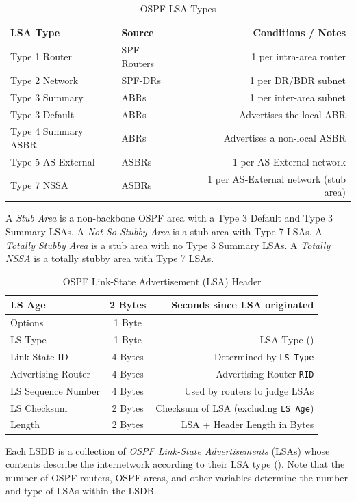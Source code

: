 \documentclass[12pt]{article}
\begin{document}
	\begin{table}[H]
	\centering
	\caption{OSPF LSA Types \label{tab:OSPF LSA TYPES}}
	\begin{tabular}{llr}\hline
	\textbf{LSA Type}		& \textbf{Source}		& \textbf{Conditions / Notes}\\\hline
	Type 1 Router		& SPF-Routers		& 1 per intra-area router\\\hline
	Type 2 Network		& SPF-DRs			& 1 per DR/BDR subnet\\\hline
	Type 3 Summary		& ABRs			& 1 per inter-area subnet\\\hline
	Type 3 Default		& ABRs			& Advertises the local ABR\\\hline
	Type 4 Summary ASBR	& ABRs			& Advertises a non-local ASBR\\\hline
	Type 5 AS-External	& ASBRs			& 1 per AS-External network\\\hline
	Type 7 NSSA		& ASBRs			& 1 per AS-External network (stub area)\\\hline
	\end{tabular}\end{table}
	
	A \textit{Stub Area} is a non-backbone OSPF area with a Type 3 Default and Type 3 Summary LSAs. A \textit{Not-So-Stubby Area} is a stub area with Type 7 LSAs. A \textit{Totally Stubby Area} is a stub area with no Type 3 Summary LSAs. A \textit{Totally NSSA} is a totally stubby area with Type 7 LSAs.

	\begin{table}[H]
	\centering
	\caption{OSPF Link-State Advertisement (LSA) Header \label{tab:OSPF LSA}}
	\begin{tabular}{| l | c | r |}\hline
	LS Age			& 2 Bytes	& Seconds since LSA originated\\\hline
	Options			& 1 Byte	&\\\hline
	LS Type			& 1 Byte	& LSA Type (\Cref{tab:OSPF LSA TYPES})\\\hline
	Link-State ID		& 4 Bytes	& Determined by \texttt{LS Type}\\\hline
	Advertising Router	& 4 Bytes	& Advertising Router \texttt{RID}\\\hline
	LS Sequence Number	& 4 Bytes	& Used by routers to judge LSAs\\\hline
	LS Checksum		& 2 Bytes	& Checksum of LSA (excluding \texttt{LS Age})\\\hline
	Length			& 2 Bytes	& LSA + Header Length in Bytes\\\hline
	\end{tabular}\end{table}
	Each LSDB is a collection of \textit{OSPF Link-State Advertisements} (LSAs) whose contents describe the internetwork according to their LSA type (). Note that the number of OSPF routers, OSPF areas, and other variables determine the number and type of LSAs within the LSDB.
\end{document}
